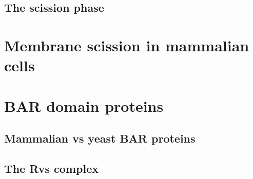 		\subsection{The scission phase}
		
		
	\section{Membrane scission in mammalian cells}
	
		
	\section{BAR domain proteins }
		\subsection{Mammalian vs yeast BAR proteins}
		\subsection{The Rvs complex}		
		
		
	
